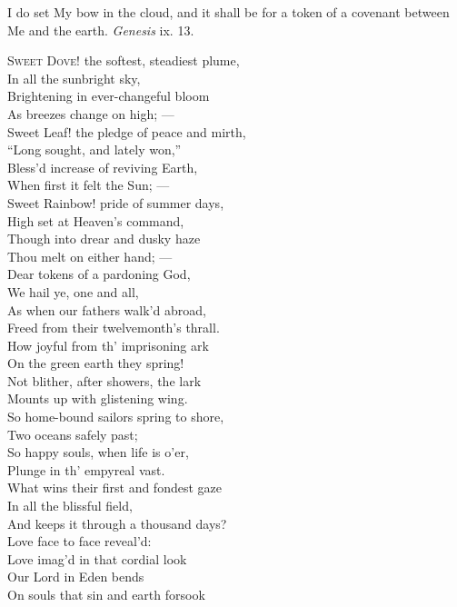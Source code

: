 
I do set My bow in the cloud, and it shall be for a token of a covenant between Me and the earth. \emph{Genesis} ix. 13.

\textsc{Sweet Dove}! the softest, steadiest plume, \\
 In all the sunbright sky, \\
 Brightening in ever-changeful bloom \\
 As breezes change on high; — \\
  Sweet Leaf! the pledge of peace and mirth, \\
 “Long sought, and lately won,” \\
 Bless’d increase of reviving Earth, \\
 When first it felt the Sun; — \\
  Sweet Rainbow! pride of summer days, \\
 High set at Heaven’s command, \\
 Though into drear and dusky haze \\
 Thou melt on either hand; — \\
  Dear tokens of a pardoning God, \\
 We hail ye, one and all, \\
 As when our fathers walk’d abroad, \\
 Freed from their twelvemonth’s thrall. \\
  How joyful from th’ imprisoning ark \\
 On the green earth they spring! \\
 Not blither, after showers, the lark \\
 Mounts up with glistening wing. \\
  So home-bound sailors spring to shore, \\
 Two oceans safely past; \\
 So happy souls, when life is o’er, \\
 Plunge in th’ empyreal vast. \\
  What wins their first and fondest gaze \\
 In all the blissful field, \\
 And keeps it through a thousand days? \\
 Love face to face reveal’d: \\
  Love imag’d in that cordial look \\
 Our Lord in Eden bends \\
 On souls that sin and earth forsook \\
